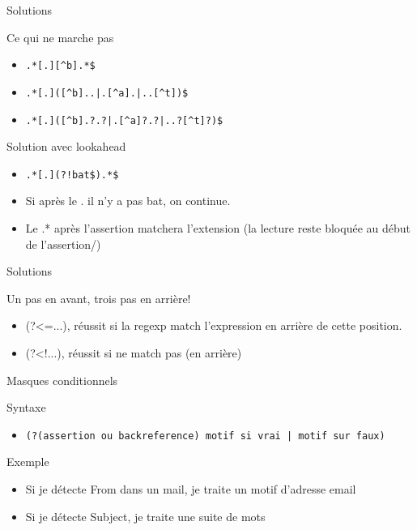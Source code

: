 \def\ftitle{Solutions}
\begin{frame}[containsverbatim]{\ftitle}
\def\blocktitle{Ce qui ne marche pas}
\begin{block}{\blocktitle}
\begin{itemize}
\item \verb!.*[.][^b].*$!
\item \verb!.*[.]([^b]..|.[^a].|..[^t])$!
\item \verb!.*[.]([^b].?.?|.[^a]?.?|..?[^t]?)$! %
\end{itemize}
\end{block}
\def\blocktitle{Solution avec lookahead}
\begin{block}{\blocktitle}
\begin{itemize}
\item \verb^.*[.](?!bat$).*$^
\item Si après le . il n'y a pas bat, on continue.
\item Le .* après l'assertion matchera l'extension (la lecture reste bloquée au début de l'assertion/)
\end{itemize}
\end{block}
\end{frame}


\begin{frame}[containsverbatim]{\ftitle}
\def\blocktitle{Un pas en avant, trois pas en arrière!}
\begin{block}{\blocktitle}
\begin{itemize}
\item (?<=...), réussit si la regexp match l'expression en arrière de cette position.
\item (?<!...), réussit si ne match pas (en arrière)
\end{itemize}
\end{block}
\end{frame}

\def\ftitle{Masques conditionnels}
\begin{frame}[containsverbatim]{\ftitle}
\def\blocktitle{Syntaxe}
\begin{block}{\blocktitle}
\begin{itemize}
\item \verb!(?(assertion ou backreference) motif si vrai | motif sur faux)!
\end{itemize}
\end{block}
\def\blocktitle{Exemple}
\begin{block}{\blocktitle}
\begin{itemize}
\item Si je détecte From dans un mail, je traite un motif d'adresse email
\item Si je détecte Subject, je traite une suite de mots
\end{itemize}
\end{block}
\end{frame}

